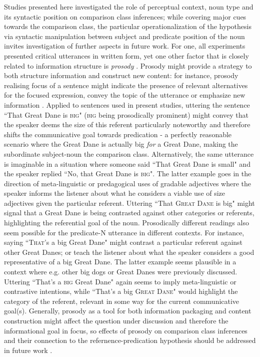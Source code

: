 Studies presented here investigated the role of perceptual context, noun type and its syntactic position on comparison class inferences; while covering major cues towards the comparison class, the particular operationalization of the hypothesis via syntactic manipulation between subject and predicate position of the noun invites investigation of further aspects in future work. For one, all experiments presented critical utterances in written form, yet one other factor that is closely related to information structure is \emph{prosody} \parencite{krifka2008basic}. Prosody might provide a strategy to both structure information and construct new content: for instance, prosody realising focus of a sentence might indicate the presence of relevant alternatives for the focused expression, convey the topic of the utterance or emphasize new information \parencite{krifka2008basic, selkirk1995sentence}. 
Applied to sentences used in present studies, uttering the sentence ``That Great Dane is \textsc{big}" (\textsc{big} being prosodically prominent) might convey that the speaker deems the size of this referent particularly noteworthy and therefore shifts the communicative goal towards predication - a perfectly reasonable scenario where the Great Dane is actually big \emph{for} a Great Dane, making the subordinate subject-noun the comparison class.  Alternatively, the same utterance is imaginable in a situation where someone said ``That Great Dane is small" and the speaker replied ``No, that Great Dane is \textsc{big}". The latter example goes in the direction of meta-linguistic or predagogical uses of gradable adjectives where the speaker informs the listener about what he considers a viable use of size adjectives given the particular referent. Uttering ``That \textsc{Great Dane} is big" might signal that a Great Dane is being contrasted against other categories or referents, highlighting the referential goal of the noun.
Prosodically different readings also seem possible for the predicate-N utterance in different contexts. For instance, saying ``\textsc{That}'s a big Great Dane" might contrast a particular referent against other Great Danes; or teach the listener about what the speaker considers a good representative of a big Great Dane. The latter example seems plausible in a context where e.g. other big dogs or Great Danes were previously discussed. Uttering ``That's a \textsc{big} Great Dane" again seems to imply meta-linguistic or contrastive intentions, while ``That's a big \textsc{Great Dane}" would highlight the category of the referent, relevant in some way for the current communicative goal(s). 
Generally, prosody as a tool for both information packaging and content construction might affect the question under discussion and therefore the informational goal in focus, so effects of prosody on comparison class inferences and their connection to the refernence-predication hypothesis should be addressed in future work \parencite[cf.][]{krifka2008basic}. 

